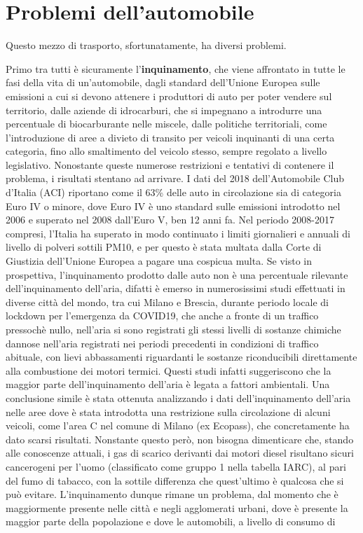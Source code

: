 
\section{Problemi dell'automobile}

Questo mezzo di trasporto, sfortunatamente, ha diversi problemi.

Primo tra tutti è sicuramente l'\textbf{inquinamento}, che viene affrontato in tutte le fasi della vita di un'automobile, dagli standard dell'Unione Europea sulle emissioni a cui si devono attenere i produttori di auto per poter vendere sul territorio, dalle aziende di idrocarburi, che si impegnano a introdurre una percentuale di biocarburante nelle miscele, dalle politiche territoriali, come l'introduzione di aree a divieto di transito per veicoli inquinanti di una certa categoria, fino allo smaltimento del veicolo stesso, sempre regolato a livello legislativo. Nonostante queste numerose restrizioni e tentativi di contenere il problema, i risultati stentano ad arrivare. I dati del 2018 dell'Automobile Club d'Italia (ACI) riportano come il 63\% delle auto in circolazione sia di categoria Euro IV o minore\cite{anfiastudiestatistiche}, dove Euro IV è uno standard sulle emissioni introdotto nel 2006 e superato nel 2008 dall'Euro V, ben 12 anni fa\cite{euroivstandard}. Nel periodo 2008-2017 compresi, l'Italia ha superato in modo continuato i limiti giornalieri e annuali di livello di polveri sottili PM10, e per questo è stata multata dalla Corte di Giustizia dell'Unione Europea a pagare una cospicua multa\cite{eunewssanzioneitalia}. Se visto in prospettiva, l'inquinamento prodotto dalle auto non è una percentuale rilevante dell'inquinamento dell'aria, difatti è emerso in numerosissimi studi effettuati in diverse città del mondo, tra cui Milano e Brescia\cite{collivignarelli2020}\cite{camaletti2020}, durante periodo locale di lockdown per l'emergenza da COVID19, che anche a fronte di un traffico pressochè nullo, nell'aria si sono registrati gli stessi livelli di sostanze chimiche dannose nell'aria registrati nei periodi precedenti in condizioni di traffico abituale, con lievi abbassamenti riguardanti le sostanze riconducibili direttamente alla combustione dei motori termici. Questi studi infatti suggeriscono che la maggior parte dell'inquinamento dell'aria è legata a fattori ambientali. Una conclusione simile è stata ottenuta analizzando i dati dell'inquinamento dell'aria nelle aree dove è stata introdotta una restrizione sulla circolazione di alcuni veicoli, come l'area C nel comune di Milano (ex Ecopass), che concretamente ha dato scarsi risultati\cite{trentini2014}. Nonstante questo però, non bisogna dimenticare che, stando alle conoscenze attuali, i gas di scarico derivanti dai motori diesel risultano sicuri cancerogeni per l'uomo (classificato come gruppo 1 nella tabella IARC), al pari del fumo di tabacco, con la sottile differenza che quest'ultimo è qualcosa che si può evitare\cite{iarctable}. L'inquinamento dunque rimane un problema, dal momento che è maggiormente presente nelle città e negli agglomerati urbani, dove è presente la maggior parte della popolazione e dove le automobili, a livello di consumo di 